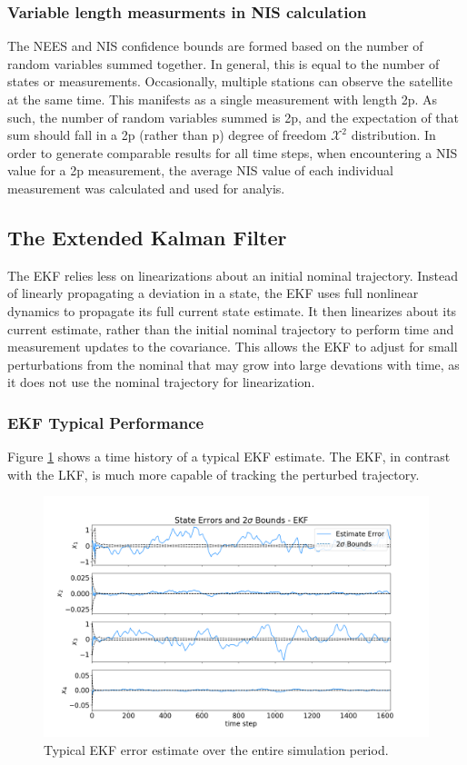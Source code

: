 \documentclass[11pt, a4paper]{article}
\begin{document}
\subsubsection{Variable length measurments in NIS calculation}
The NEES and NIS confidence bounds are formed based on the number of random variables summed together. 
In general, this is equal to the number of states or measurements. 
Occasionally, multiple stations can observe the satellite at the same time.
This manifests as a single measurement with length 2p.
As such, the number of random variables summed is 2p, and the expectation of that sum should fall in a 2p (rather than p) degree of freedom $\mathcal{X}^2$ distribution. 
In order to generate comparable results for all time steps, when encountering a NIS value for a 2p measurement, the average NIS value of each individual measurement was calculated and used for analyis.


\subsection{The Extended Kalman Filter}
\label{sec: EKF}
The EKF relies less on linearizations about an initial nominal trajectory.
Instead of linearly propagating a deviation in a state, the EKF uses full nonlinear dynamics to propagate its full current state estimate. 
It then linearizes about its current estimate, rather than the initial nominal trajectory to perform time and measurement updates to the covariance.   
This allows the EKF to adjust for small perturbations from the nominal that may grow into large devations with time, as it does not use the nominal trajectory for linearization. 

\subsubsection{EKF Typical Performance}
Figure \ref{fig:ekf_est} shows a time history of a typical EKF estimate. 
The EKF, in contrast with the LKF, is much more capable of tracking the perturbed trajectory.  

\begin{figure}[H]
	\centering
	\includegraphics[width=\textwidth]{Figures/ekf_estimate_th.png}
	\caption{Typical EKF error estimate over the entire simulation period. }
	\label{fig:ekf_est}
\end{figure}
\end{document}

